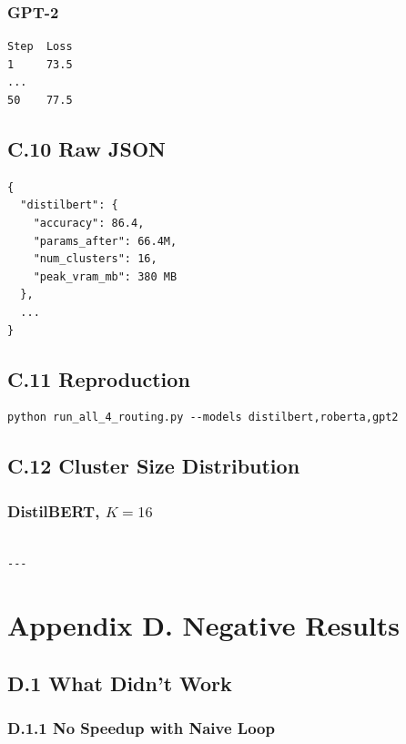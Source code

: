\subsubsection{GPT-2}

\begin{lstlisting}
Step  Loss
1     73.5
...
50    77.5
\end{lstlisting}

\subsection{C.10 Raw JSON}

\begin{lstlisting}
{
  "distilbert": {
    "accuracy": 86.4,
    "params_after": 66.4M,
    "num_clusters": 16,
    "peak_vram_mb": 380 MB
  },
  ...
}
\end{lstlisting}

\subsection{C.11 Reproduction}

\begin{lstlisting}
python run_all_4_routing.py --models distilbert,roberta,gpt2
\end{lstlisting}

\subsection{C.12 Cluster Size Distribution}

\subsubsection{DistilBERT, $K=16$}

\begin{lstlisting}

---
\end{lstlisting}


\section{Appendix D. Negative Results}

\subsection{D.1 What Didn't Work}

\subsubsection{D.1.1 No Speedup with Naive Loop}

